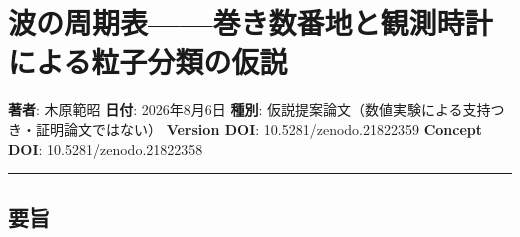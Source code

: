 \documentclass[
]{ltjsarticle}
\author{}
\date{}
\begin{document}
\section{波の周期表------巻き数番地と観測時計による粒子分類の仮説}\label{ux6ce2ux306eux5468ux671fux8868ux5dfbux304dux6570ux756aux5730ux3068ux89b3ux6e2cux6642ux8a08ux306bux3088ux308bux7c92ux5b50ux5206ux985eux306eux4eeeux8aac}

\textbf{著者}: 木原範昭 \textbf{日付}: 2026年8月6日 \textbf{種別}:
仮説提案論文（数値実験による支持つき・証明論文ではない） \textbf{Version
DOI}: 10.5281/zenodo.21822359 \textbf{Concept DOI}:
10.5281/zenodo.21822358

\begin{center}\rule{0.5\linewidth}{0.5pt}\end{center}

\subsection{要旨}\label{ux8981ux65e8}
\end{document}
